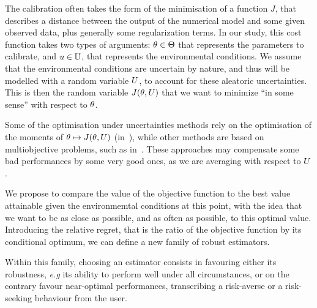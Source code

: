 \documentclass[../../Main_ManuscritThese.tex]{subfiles}
\begin{document}
  The calibration often takes the form of the minimisation of a
function $J$, that describes a distance between the output of the
numerical model and some given observed data, plus generally some
regularization terms.  In our study, this cost function takes two
types of arguments: $\theta\in\Theta$ that represents the parameters to
calibrate, and $u\in\mathbb{U}$, that represents the environmental
conditions.  We assume that the environmental conditions are uncertain
by nature, and thus will be modelled with a random variable $U$, to
account for these aleatoric uncertainties.  This is then the random
variable $J(\theta,U)$ that we want to minimize ``in some sense'' with
respect to $\theta$.

  Some of the optimisation under uncertainties methods rely on the
optimisation of the moments of $ \theta\mapsto J(\theta,U)$
(in~\cite{lehman_designing_2004,janusevskis_simultaneous_2010}), while
other methods are based on multiobjective problems, such as
in~\cite{baudoui_optimisation_2012,ribaud_krigeage_2018}.  These
approaches may compensate some bad performances by some very good
ones, as we are averaging with respect to  $U$.

  
  We propose to compare the value of the objective function to the
best value attainable given the environmemtal conditions at this
point, with the idea that we want to be as close as possible, and as
often as possible, to this optimal value. Introducing the relative
regret, that is the ratio of the objective function by its conditional
optimum, we can define a new family of robust estimators.

  Within this family, choosing an estimator consists in favouring
either its robustness, \emph{e.g} its ability to perform well under
all circumstances, or on the contrary favour near-optimal
performances, transcribing a risk-averse or a risk-seeking behaviour
from the user.
 

\clearpage
\subfileLocal{
	\pagestyle{empty}
	
	
}
\end{document}

